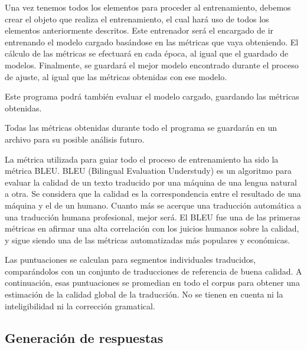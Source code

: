 Una vez tenemos todos los elementos para proceder al entrenamiento, debemos crear el objeto que realiza el entrenamiento, el cual hará uso de todos los elementos anteriormente descritos. Este entrenador será el encargado de ir entrenando el modelo cargado basándose en las métricas que vaya obteniendo. El cálculo de las métricas se efectuará en cada época, al igual que el guardado de modelos. Finalmente, se guardará el mejor modelo encontrado durante el proceso de ajuste, al igual que las métricas obtenidas con ese modelo.

Este programa podrá también evaluar el modelo cargado, guardando las métricas obtenidas.

Todas las métricas obtenidas durante todo el programa se guardarán en un archivo para su posible análisis futuro.

La métrica utilizada para guiar todo el proceso de entrenamiento ha sido la métrica BLEU. BLEU (Bilingual Evaluation Understudy) es un algoritmo para evaluar la calidad de un texto traducido por una máquina de una lengua natural a otra. Se considera que la calidad es la correspondencia entre el resultado de una máquina y el de un humano. Cuanto más se acerque una traducción automática a una traducción humana profesional, mejor será. El BLEU fue una de las primeras métricas en afirmar una alta correlación con los juicios humanos sobre la calidad, y sigue siendo una de las métricas automatizadas más populares y económicas.

Las puntuaciones se calculan para segmentos individuales traducidos, comparándolos con un conjunto de traducciones de referencia de buena calidad. A continuación, esas puntuaciones se promedian en todo el corpus para obtener una estimación de la calidad global de la traducción. No se tienen en cuenta ni la inteligibilidad ni la corrección gramatical.

\subsection{Generación de respuestas}

